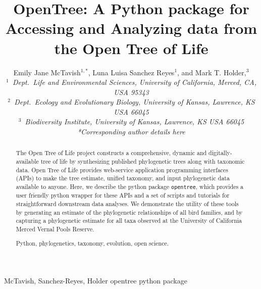 \documentclass[oupdraft]{sysbio_sse}
\begin{document}
\title{OpenTree: A Python package for Accessing and Analyzing data from the Open Tree of Life}

\author{Emily Jane McTavish$^{1,\ast}$, Luna Luisa Sanchez Reyes$^{1}$, and
Mark T. Holder,$^{3}$\\[4pt]
\textit{$^{1}$~Dept.~Life and Environmental Sciences, University of California, Merced, CA, USA 95343}
\\
\textit{$^{2}$~Dept.~Ecology and Evolutionary Biology, University of Kansas, Lawrence, KS USA 66045}\\
\textit{$^{3}$~Biodiversity Institute, University of Kansas, Lawrence, KS USA 66045}
\\[2pt]
\textit{*Corresponding author details here}}

\markboth%
{McTavish, Sanchez-Reyes, Holder}
{opentree python package}

\maketitle

\begin{abstract}
{The Open Tree of Life project constructs a comprehensive, dynamic and digitally-available tree of life by synthesizing published phylogenetic trees along with taxonomic data.
Open Tree of Life provides web-service application programming interfaces (APIs) to make the tree estimate, unified taxonomy, and input phylogenetic data available to anyone.
Here, we describe the python package \texttt{opentree}, which provides a user friendly python wrapper for these APIs and a set of scripts and tutorials for straightforward downstream data analyses.
We demonstrate the utility of these tools by generating an estimate of the phylogenetic relationships of all bird families, and by capturing a phylogenetic estimate for all taxa  observed at the University of California Merced Vernal Pools Reserve.
}

{Python, phylogenetics, taxonomy, evolution, open science.}
\end{abstract}
\newline
\end{document}

